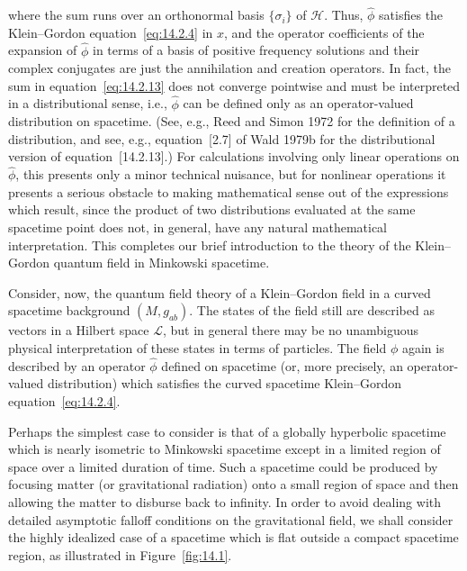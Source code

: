 where the sum runs over an orthonormal basis \(\{\sigma_i\}\) of \(\mathcal H\).
Thus, \(\widehat\phi\) satisfies the Klein--Gordon equation~\eqref{eq:14.2.4} in
\(x\), and the operator coefficients of the expansion of \(\widehat\phi\) in terms of
a basis of positive frequency solutions and their complex conjugates are just the
annihilation and creation operators. In fact, the sum in
equation~\eqref{eq:14.2.13} does not converge pointwise and must be interpreted in
a distributional sense, i.e., \(\widehat\phi\) can be defined only as an operator-valued
distribution on spacetime. (See, e.g., Reed and Simon 1972 for the definition of a
distribution, and see, e.g., equation~[2.7] of Wald 1979b for the distributional version
of equation~[14.2.13].) For calculations involving only linear operations on
\(\widehat\phi\), this presents only a minor technical nuisance, but for nonlinear
operations it presents a serious obstacle to making mathematical sense out of the
expressions which result, since the product of two distributions evaluated at the same
spacetime point does not, in general, have any natural mathematical interpretation.
This completes our brief introduction to the theory of the Klein--Gordon quantum
field in Minkowski spacetime.

Consider, now, the quantum field theory of a Klein--Gordon field in a curved
spacetime background \((M,g_{ab})\). The states of the field still are described as
vectors in a Hilbert space \(\mathcal L\), but in general there may be no unambiguous
physical interpretation of these states in terms of particles. The field \(\phi\) again
is described by an operator \(\widehat\phi\) defined on spacetime (or, more precisely,
an operator-valued distribution) which satisfies the curved spacetime Klein--Gordon
equation~\eqref{eq:14.2.4}.

Perhaps the simplest case to consider is that of a globally hyperbolic spacetime
which is nearly isometric to Minkowski spacetime except in a limited region of space
over a limited duration of time. Such a spacetime could be produced by focusing
matter (or gravitational radiation) onto a small region of space and then allowing the
matter to disburse back to infinity. In order to avoid dealing with detailed asymptotic
falloff conditions on the gravitational field, we shall consider the highly idealized
case of a spacetime which is flat outside a compact spacetime region, as illustrated
in Figure~\ref{fig:14.1}.



